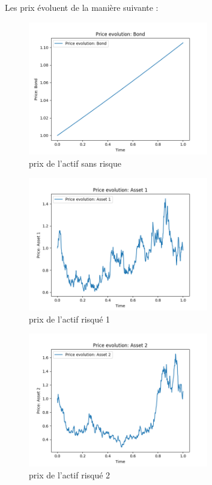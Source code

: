 \documentclass[../finalreport.tex]{subfiles}
\begin{document}
\par Les prix évoluent de la manière suivante :
\begin{figure}[H]
  \centering
    \includegraphics[width=0.7\textwidth]{images/simulation_1/price_0.png}
  \caption{prix de l'actif sans risque}
\end{figure}

\begin{figure}[H]
  \centering
    \includegraphics[width=0.7\textwidth]{images/simulation_1/price_1.png}
  \caption{prix de l'actif risqué 1}
\end{figure}

\begin{figure}[H]
  \centering
    \includegraphics[width=0.7\textwidth]{images/simulation_1/price_2.png}
  \caption{prix de l'actif risqué 2}
\end{figure}
\end{document}
